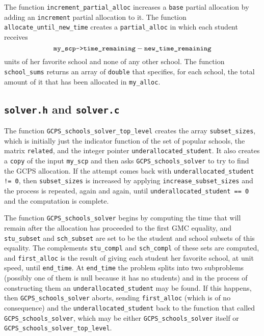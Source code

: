 \documentclass[12pt]{article}
\theoremstyle{definition}
\begin{document}
\begin{appendix}
The function \texttt{increment\_partial\_alloc} increases a
\texttt{base} partial allocation by adding an \texttt{increment}
partial allocation to it.  The function
\texttt{allocate\_until\_new\_time} creates a \texttt{partial\_alloc}
in which each student receives
$$\text{\texttt{my\_scp->time\_remaining}} -
\text{\texttt{new\_time\_remaining}}$$ units of her favorite school
and none of any other school.  The function \texttt{school\_sums}
returns an array of \texttt{double} that specifies, for each school,
the total amount of it that has been allocated in \texttt{my\_alloc}.

\subsection{\texttt{solver.h} and \texttt{solver.c}}

The function \texttt{GCPS\_schools\_solver\_top\_level} creates the
array \texttt{subset\_sizes}, which is initially just the indicator
function of the set of popular schools, the matrix \texttt{related},
and the integer pointer \texttt{underallocated\_student}.  It also
creates a \texttt{copy} of the input \texttt{my\_scp} and then asks
\texttt{GCPS\_schools\_solver} to try to find the GCPS allocation.  If
the attempt comes back with \texttt{underallocated\_student != 0},
then \texttt{subset\_sizes} is increased by applying
\texttt{increase\_subset\_sizes} and the process is repeated, again
and again, until \texttt{underallocated\_student == 0} and the
computation is complete.

The function \texttt{GCPS\_schools\_solver} begins by computing the
time that will remain after the allocation has proceeded to the first
GMC equality, and \texttt{stu\_subset} and \texttt{sch\_subset} are
set to be the student and school subsets of this equality.  The
complements \texttt{stu\_compl} and \texttt{sch\_compl} of these sets
are computed, and \texttt{first\_alloc} is the result of giving each
student her favorite school, at unit speed, until \texttt{end\_time}.
At \texttt{end\_time} the problem splits into two subproblems
(possibly one of them is null because it has no students) and in the
process of constructing them an \texttt{underallocated\_student} may
be found.  If this happens, then \texttt{GCPS\_schools\_solver}
aborts, sending \texttt{first\_alloc} (which is of no consequence) and
the \texttt{underallocated\_student} back to the function that called
\texttt{GCPS\_schools\_solver}, which may be either
\texttt{GCPS\_schools\_solver} itself or
\texttt{GCPS\_schools\_solver\_top\_level}.


\end{appendix}
\end{document}
